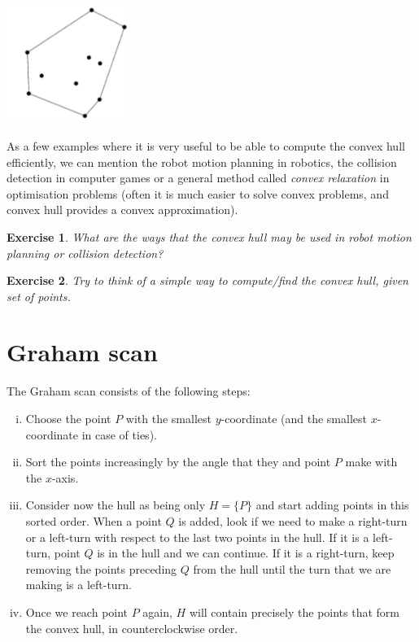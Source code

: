 \documentclass{article}
\newtheorem{exercise}{Exercise}
\begin{document}
\begin{center}
\includegraphics[width=4cm]{hull}
\end{center}

\noindent As a few examples where it is very useful to be able to compute the convex hull efficiently, we can mention the robot motion planning in robotics, the collision detection in computer games or a general method called \textit{convex relaxation} in optimisation problems (often it is much easier to solve convex problems, and convex hull provides a convex approximation).

\begin{exercise}
What are the ways that the convex hull may be used in robot motion planning or collision detection?
\end{exercise}

\begin{exercise}
Try to think of a simple way to compute/find the convex hull, given set of points.
\end{exercise}

\section*{Graham scan}
The Graham scan consists of the following steps:

\begin{enumerate}[(i)]
    \item {
        Choose the point $P$ with the smallest $y$-coordinate (and the smallest $x$-coordinate in case of ties).
    }
    \item {
        Sort the points increasingly by the angle that they and point $P$ make with the $x$-axis.
    }
    \item {
        Consider now the hull as being only $H = \{P\}$ and start adding points in this sorted order. When a point $Q$ is added, look if we need to make a right-turn or a left-turn with respect to the last two points in the hull. If it is a left-turn, point $Q$ is in the hull and we can continue. If it is a right-turn, keep removing the points preceding $Q$ from the hull until the turn that we are making is a left-turn.
    }
    \item {
        Once we reach point $P$ again, $H$ will contain precisely the points that form the convex hull, in counterclockwise order.
    }

\end{enumerate}
\end{document}

